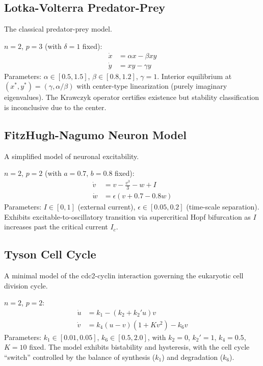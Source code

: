 \documentclass[11pt]{article}
\begin{document}
\subsection{Lotka-Volterra Predator-Prey}

The classical predator-prey model.

$n=2$, $p=3$ (with $\delta=1$ fixed):
\begin{align*}
\dot{x} &= \alpha x - \beta x y \\
\dot{y} &= xy - \gamma y
\end{align*}
Parameters: $\alpha \in [0.5, 1.5]$, $\beta \in [0.8, 1.2]$, $\gamma = 1$.
Interior equilibrium at $(x^*, y^*) = (\gamma, \alpha/\beta)$ with center-type linearization (purely imaginary eigenvalues).
The Krawczyk operator certifies existence but stability classification is inconclusive due to the center.

\subsection{FitzHugh-Nagumo Neuron Model}

A simplified model of neuronal excitability.

$n=2$, $p=2$ (with $a=0.7$, $b=0.8$ fixed):
\begin{align*}
\dot{v} &= v - \frac{v^3}{3} - w + I \\
\dot{w} &= \epsilon(v + 0.7 - 0.8w)
\end{align*}
Parameters: $I \in [0, 1]$ (external current), $\epsilon \in [0.05, 0.2]$ (time-scale separation).
Exhibits excitable-to-oscillatory transition via supercritical Hopf bifurcation as $I$ increases past the critical current $I_c$.

\subsection{Tyson Cell Cycle~\cite{tyson1991}}

A minimal model of the cdc2-cyclin interaction governing the eukaryotic cell division cycle.

$n=2$, $p=2$:
\begin{align*}
\dot{u} &= k_1 - (k_2 + k_2' u) v \\
\dot{v} &= k_4 (u - v)(1 + K v^2) - k_6 v
\end{align*}
Parameters: $k_1 \in [0.01, 0.05]$, $k_6 \in [0.5, 2.0]$, with $k_2 = 0$, $k_2' = 1$, $k_4 = 0.5$, $K = 10$ fixed.
The model exhibits bistability and hysteresis, with the cell cycle ``switch'' controlled by the balance of synthesis ($k_1$) and degradation ($k_6$).
\end{document}
